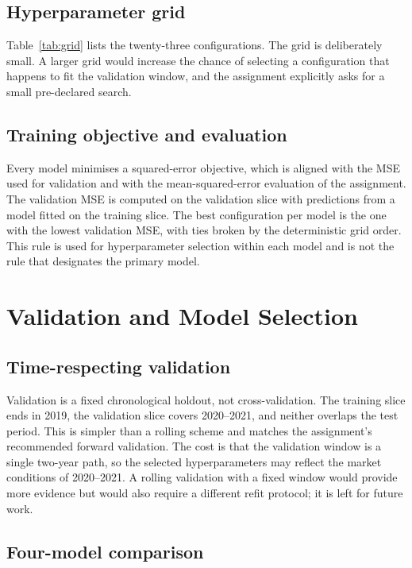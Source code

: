 \documentclass[11pt,a4paper]{article}
\begin{document}
\subsection{Hyperparameter grid}

Table~\ref{tab:grid} lists the twenty-three configurations. The grid is deliberately small. A larger grid would increase the chance of selecting a configuration that happens to fit the validation window, and the assignment explicitly asks for a small pre-declared search.



\subsection{Training objective and evaluation}

Every model minimises a squared-error objective, which is aligned with the MSE used for validation and with the mean-squared-error evaluation of the assignment. The validation MSE is computed on the validation slice with predictions from a model fitted on the training slice. The best configuration per model is the one with the lowest validation MSE, with ties broken by the deterministic grid order. This rule is used for hyperparameter selection within each model and is not the rule that designates the primary model.


\section{Validation and Model Selection}
\label{sec:validation}

\subsection{Time-respecting validation}

Validation is a fixed chronological holdout, not cross-validation. The training slice ends in 2019, the validation slice covers 2020--2021, and neither overlaps the test period. This is simpler than a rolling scheme and matches the assignment's recommended forward validation. The cost is that the validation window is a single two-year path, so the selected hyperparameters may reflect the market conditions of 2020--2021. A rolling validation with a fixed window would provide more evidence but would also require a different refit protocol; it is left for future work.

\subsection{Four-model comparison}
\end{document}
